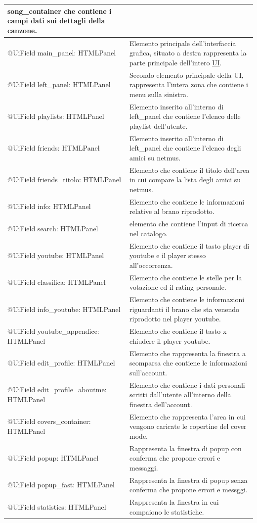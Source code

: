 \begin{longtable}{|p{}|p{}|}
song\_container che contiene i campi dati sui dettagli della canzone.\\\hline
@UiField main\_panel: HTMLPanel & Elemento principale dell'interfaccia
grafica, situato a destra rappresenta la parte principale dell'intero
\underline{UI}.\\\hline @UiField left\_panel: HTMLPanel & Secondo elemento
principale della UI, rappresenta l'intera zona che contiene i menu sulla sinistra.\\\hline
@UiField playlists: HTMLPanel & Elemento inserito all'interno di
left\_panel che contiene l'elenco delle playlist dell'utente.\\\hline
@UiField friends: HTMLPanel & Elemento inserito all'interno di
left\_panel che contiene l'elenco degli amici su netmus.\\\hline
@UiField friends\_titolo: HTMLPanel & Elemento che contiene il titolo
dell'area in cui compare la lista degli amici su netmus.\\\hline
@UiField info: HTMLPanel & Elemento che contiene le informazioni
relative al brano riprodotto.\\\hline
@UiField search: HTMLPanel & elemento che contiene l'input di ricerca
nel catalogo.\\\hline
@UiField youtube: HTMLPanel & Elemento che contiene il tasto player di
youtube e il player stesso all'occorrenza.\\\hline
@UiField classifica: HTMLPanel & Elemento che contiene le stelle per la
votazione ed il rating personale.\\\hline
@UiField info\_youtube: HTMLPanel & Elemento che contiene le informazioni
riguardanti il brano che sta venendo riprodotto nel player youtube.\\\hline
@UiField youtube\_appendice: HTMLPanel & Elemento che contiene il tasto
x chiudere il player youtube.\\\hline
@UiField edit\_profile: HTMLPanel & Elemento che rappresenta la finestra
a scomparsa che contiene le informazioni sull'account.\\\hline
@UiField edit\_profile\_aboutme: HTMLPanel & Elemento che contiene i
dati personali scritti dall'utente all'interno della finestra
dell'account.\\\hline
@UiField covers\_container: HTMLPanel & Elemento che rappresenta l'area in cui
vengono caricate le copertine del cover mode. \\\hline
@UiField popup: HTMLPanel & Rappresenta la finestra di popup con conferma che
propone errori e messaggi. \\\hline
@UiField popup\_fast: HTMLPanel & Rappresenta la finestra di popup senza
conferma che propone errori e messggi. \\\hline
@UiField statistics: HTMLPanel & Rappresenta la finestra in cui compaiono le
statistiche. \\\hline


\end{longtable}
